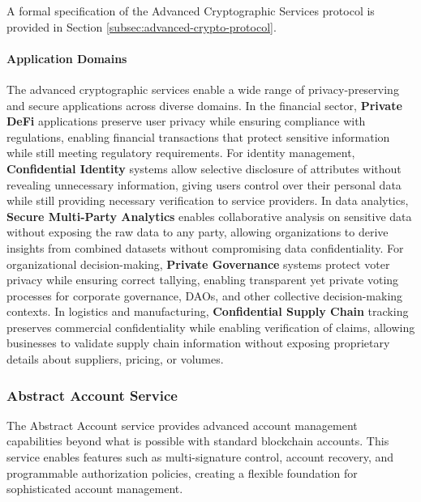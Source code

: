 \documentclass[12pt,a4paper]{article}
\begin{document}
A formal specification of the Advanced Cryptographic Services protocol is provided in Section \ref{subsec:advanced-crypto-protocol}.



\paragraph{Application Domains}
The advanced cryptographic services enable a wide range of privacy-preserving and secure applications across diverse domains. In the financial sector, \textbf{Private DeFi} applications preserve user privacy while ensuring compliance with regulations, enabling financial transactions that protect sensitive information while still meeting regulatory requirements. For identity management, \textbf{Confidential Identity} systems allow selective disclosure of attributes without revealing unnecessary information, giving users control over their personal data while still providing necessary verification to service providers. In data analytics, \textbf{Secure Multi-Party Analytics} enables collaborative analysis on sensitive data without exposing the raw data to any party, allowing organizations to derive insights from combined datasets without compromising data confidentiality. For organizational decision-making, \textbf{Private Governance} systems protect voter privacy while ensuring correct tallying, enabling transparent yet private voting processes for corporate governance, DAOs, and other collective decision-making contexts. In logistics and manufacturing, \textbf{Confidential Supply Chain} tracking preserves commercial confidentiality while enabling verification of claims, allowing businesses to validate supply chain information without exposing proprietary details about suppliers, pricing, or volumes.

\subsubsection{Abstract Account Service}
\label{subsubsec:abstract-account}

The Abstract Account service provides advanced account management capabilities beyond what is possible with standard blockchain accounts. This service enables features such as multi-signature control, account recovery, and programmable authorization policies, creating a flexible foundation for sophisticated account management.


\end{document}
